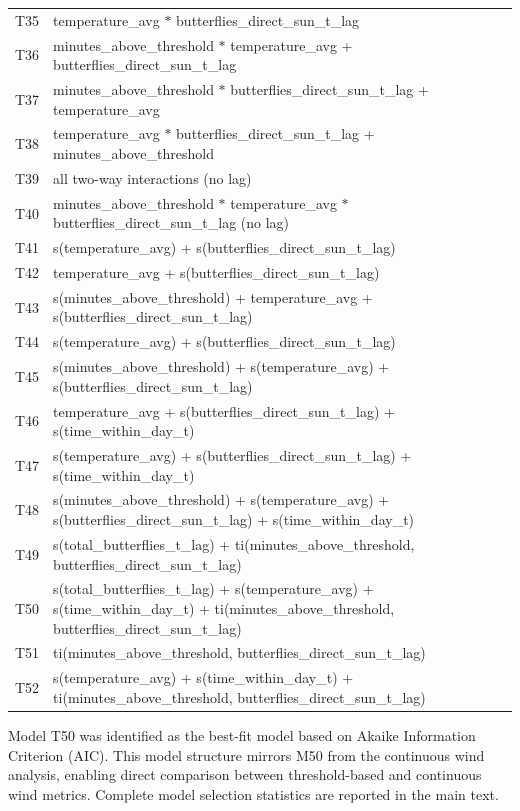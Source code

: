 \documentclass[insects,article,submit,pdftex,moreauthors]{Definitions/mdpi}
\begin{document}
\begin{appendix}
\begin{longtable}{ll}
T35 & temperature\_avg $*$ butterflies\_direct\_sun\_t\_lag \\
T36 & minutes\_above\_threshold $*$ temperature\_avg + butterflies\_direct\_sun\_t\_lag \\
T37 & minutes\_above\_threshold $*$ butterflies\_direct\_sun\_t\_lag + temperature\_avg \\
T38 & temperature\_avg $*$ butterflies\_direct\_sun\_t\_lag + minutes\_above\_threshold \\
T39 & all two-way interactions (no lag) \\
T40 & minutes\_above\_threshold $*$ temperature\_avg $*$ butterflies\_direct\_sun\_t\_lag (no lag) \\
T41 & s(temperature\_avg) + s(butterflies\_direct\_sun\_t\_lag) \\
T42 & temperature\_avg + s(butterflies\_direct\_sun\_t\_lag) \\
T43 & s(minutes\_above\_threshold) + temperature\_avg + s(butterflies\_direct\_sun\_t\_lag) \\
T44 & s(temperature\_avg) + s(butterflies\_direct\_sun\_t\_lag) \\
T45 & s(minutes\_above\_threshold) + s(temperature\_avg) + s(butterflies\_direct\_sun\_t\_lag) \\
T46 & temperature\_avg + s(butterflies\_direct\_sun\_t\_lag) + s(time\_within\_day\_t) \\
T47 & s(temperature\_avg) + s(butterflies\_direct\_sun\_t\_lag) + s(time\_within\_day\_t) \\
T48 & s(minutes\_above\_threshold) + s(temperature\_avg) + s(butterflies\_direct\_sun\_t\_lag) + s(time\_within\_day\_t) \\
T49 & s(total\_butterflies\_t\_lag) + ti(minutes\_above\_threshold, butterflies\_direct\_sun\_t\_lag) \\
T50 & s(total\_butterflies\_t\_lag) + s(temperature\_avg) + s(time\_within\_day\_t) + ti(minutes\_above\_threshold, butterflies\_direct\_sun\_t\_lag) \\
T51 & ti(minutes\_above\_threshold, butterflies\_direct\_sun\_t\_lag) \\
T52 & s(temperature\_avg) + s(time\_within\_day\_t) + ti(minutes\_above\_threshold, butterflies\_direct\_sun\_t\_lag) \\
\bottomrule
\end{longtable}

Model T50 was identified as the best-fit model based on Akaike Information Criterion (AIC). This model structure mirrors M50 from the continuous wind analysis, enabling direct comparison between threshold-based and continuous wind metrics. Complete model selection statistics are reported in the main text.



\end{appendix}
\end{document}
